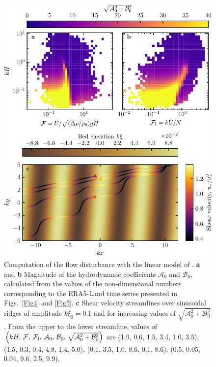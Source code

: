 \begin{figure}[p]
\centering
\includegraphics[scale=1]{Figures/Figure16_supp.pdf}
\caption{Computation of the flow disturbance with the linear model of \citet{Andreotti2009}. \textbf{a} and \textbf{b} Magnitude of the hydrodynamic coefficients $\mathcal{A}_0$ and $\mathcal{B}_0$, calculated from the values of the non-dimensional numbers corresponding to the ERA5-Land time series presented in Figs.~\ref{Fig4} and \ref{Fig5}. \textbf{c} Shear velocity streamlines over sinusoidal ridges of amplitude $k\xi_0 = 0.1$ and for increasing values of $\sqrt{\mathcal{A}_{0}^{2} + \mathcal{B}_{0}^{2}}$. From the upper to the lower streamline, values of $\left(kH,\, \mathcal{F},\, \mathcal{F}_{\rm I},\, \mathcal{A}_{0},\, \mathcal{B}_{0},\, \sqrt{\mathcal{A}_{0}^{2} + \mathcal{B}_{0}^{2}}\right)$ are (1.9, 0.6, 1.5, 3.4, 1.0, 3.5), (1.5, 0.3, 0.4, 4.8, 1.4, 5.0), (0.1, 3.5, 1.0, 8.6, 0.1, 8.6), (0.5, 0.05, 0.04, 9.6, 2.5, 9.9).}
\label{Fig16_supp}
\end{figure}


